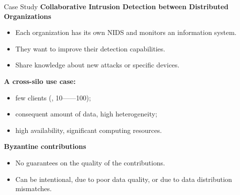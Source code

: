 \begin{frame}{Case Study}
  \textbf{Collaborative Intrusion Detection between Distributed Organizations}
  \begin{itemize}
    \item Each organization has its own NIDS and monitors an information system.
    \item They want to improve their detection capabilities.
    \item Share knowledge about new attacks or specific devices.
  \end{itemize}

  \pause
  \textbf{A cross-silo use case:}
  \begin{itemize}
    \item few clients (\ie, 10——100);
    \item consequent amount of data, high heterogeneity;
    \item high availability, significant computing resources.
  \end{itemize}

  \pause
  \textbf{Byzantine contributions}
  \begin{itemize}
    \item No guarantees on the quality of the contributions.
    \item Can be intentional, due to poor data quality, or due to data distribution mismatches.
  \end{itemize}
\end{frame}


